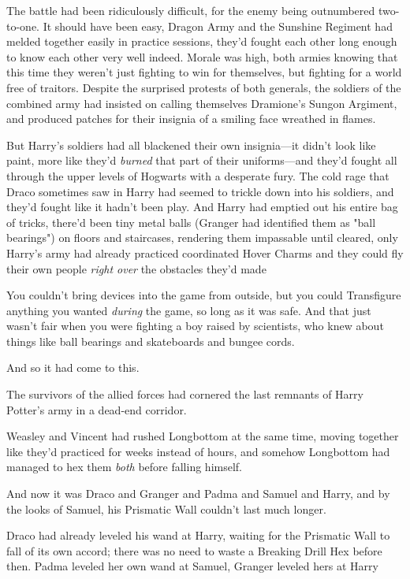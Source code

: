 The battle had been ridiculously difficult, for the enemy being outnumbered
two-to-one. It should have been easy, Dragon Army and the Sunshine Regiment had
melded together easily in practice sessions, they'd fought each other long
enough to know each other very well indeed. Morale was high, both armies
knowing that this time they weren't just fighting to win for themselves, but
fighting for a world free of traitors. Despite the surprised protests of both
generals, the soldiers of the combined army had insisted on calling themselves
Dramione's Sungon Argiment, and produced patches for their insignia of a
smiling face wreathed in flames.

But Harry's soldiers had all blackened their own insignia—it didn't look like
paint, more like they'd \emph{burned} that part of their uniforms—and they'd
fought all through the upper levels of Hogwarts with a desperate fury. The cold
rage that Draco sometimes saw in Harry had seemed to trickle down into his
soldiers, and they'd fought like it hadn't been play. And Harry had emptied out
his entire bag of tricks, there'd been tiny metal balls (Granger had identified
them as "ball bearings") on floors and staircases, rendering them impassable
until cleared, only Harry's army had already practiced coordinated Hover Charms
and they could fly their own people \emph{right over} the obstacles they'd
made{\el}

You couldn't bring devices into the game from outside, but you could
Transfigure anything you wanted \emph{during} the game, so long as it was safe.
And that just wasn't fair when you were fighting a boy raised by scientists,
who knew about things like ball bearings and skateboards and bungee cords.

And so it had come to this.

The survivors of the allied forces had cornered the last remnants of Harry
Potter's army in a dead-end corridor.

Weasley and Vincent had rushed Longbottom at the same time, moving together
like they'd practiced for weeks instead of hours, and somehow Longbottom had
managed to hex them \emph{both} before falling himself.

And now it was Draco and Granger and Padma and Samuel and Harry, and by the
looks of Samuel, his Prismatic Wall couldn't last much longer.

Draco had already leveled his wand at Harry, waiting for the Prismatic Wall to
fall of its own accord; there was no need to waste a Breaking Drill Hex before
then. Padma leveled her own wand at Samuel, Granger leveled hers at
Harry{\el}

